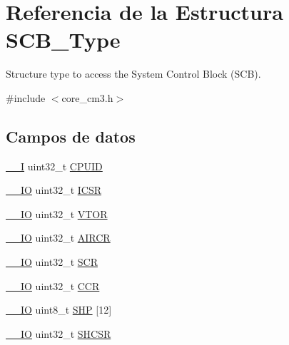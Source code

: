 \hypertarget{struct_s_c_b___type}{}\section{Referencia de la Estructura S\+C\+B\+\_\+\+Type}
\label{struct_s_c_b___type}


Structure type to access the System Control Block (S\+CB).  




{\ttfamily \#include $<$core\+\_\+cm3.\+h$>$}

\subsection*{Campos de datos}
\begin{DoxyCompactItemize}
\item 
\mbox{\hyperlink{core__cm3_8h_af63697ed9952cc71e1225efe205f6cd3}{\+\_\+\+\_\+I}} uint32\+\_\+t \mbox{\hyperlink{struct_s_c_b___type_a30abfea43143a424074f682bd61eace0}{C\+P\+U\+ID}}
\item 
\mbox{\hyperlink{core__cm3_8h_aec43007d9998a0a0e01faede4133d6be}{\+\_\+\+\_\+\+IO}} uint32\+\_\+t \mbox{\hyperlink{struct_s_c_b___type_a8fec9e122b923822e7f951cd48cf1d47}{I\+C\+SR}}
\item 
\mbox{\hyperlink{core__cm3_8h_aec43007d9998a0a0e01faede4133d6be}{\+\_\+\+\_\+\+IO}} uint32\+\_\+t \mbox{\hyperlink{struct_s_c_b___type_aaf388a921a016cae590cfcf1e43b1cdf}{V\+T\+OR}}
\item 
\mbox{\hyperlink{core__cm3_8h_aec43007d9998a0a0e01faede4133d6be}{\+\_\+\+\_\+\+IO}} uint32\+\_\+t \mbox{\hyperlink{struct_s_c_b___type_aaec159b48828355cb770049b8b2e8d91}{A\+I\+R\+CR}}
\item 
\mbox{\hyperlink{core__cm3_8h_aec43007d9998a0a0e01faede4133d6be}{\+\_\+\+\_\+\+IO}} uint32\+\_\+t \mbox{\hyperlink{struct_s_c_b___type_a64a95891ad3e904dd5548112539c1c98}{S\+CR}}
\item 
\mbox{\hyperlink{core__cm3_8h_aec43007d9998a0a0e01faede4133d6be}{\+\_\+\+\_\+\+IO}} uint32\+\_\+t \mbox{\hyperlink{struct_s_c_b___type_a5e1322e27c40bf91d172f9673f205c97}{C\+CR}}
\item 
\mbox{\hyperlink{core__cm3_8h_aec43007d9998a0a0e01faede4133d6be}{\+\_\+\+\_\+\+IO}} uint8\+\_\+t \mbox{\hyperlink{struct_s_c_b___type_a17dc9f83c53cbf7fa249e79a2d2a43f8}{S\+HP}} \mbox{[}12\mbox{]}
\item 
\mbox{\hyperlink{core__cm3_8h_aec43007d9998a0a0e01faede4133d6be}{\+\_\+\+\_\+\+IO}} uint32\+\_\+t \mbox{\hyperlink{struct_s_c_b___type_a04d136e5436e5fa2fb2aaa78a5f86b19}{S\+H\+C\+SR}}

\end{DoxyCompactItemize}
